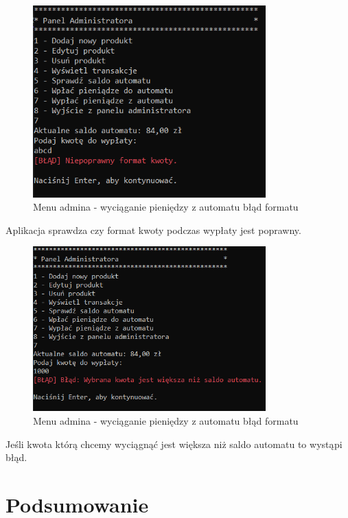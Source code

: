 \begin{figure}[H] 
    \centering
    \includegraphics[width=0.8\textwidth]{grafiki/blad_format_wyplac.png}
    \caption{\footnotesize Menu admina - wyciąganie pieniędzy z automatu błąd formatu}	
    \label{fig:5.22}
\end{figure}

Aplikacja sprawdza czy format kwoty podczas wypłaty jest poprawny.

\begin{figure}[H] 
    \centering
    \includegraphics[width=0.8\textwidth]{grafiki/blad_kwota_wyplac.png}
    \caption{\footnotesize Menu admina - wyciąganie pieniędzy z automatu błąd formatu}	
    \label{fig:5.23}
\end{figure}

Jeśli kwota którą chcemy wyciągnąć jest większa niż saldo automatu to wystąpi błąd.



\chapter{Podsumowanie}

